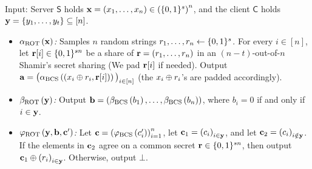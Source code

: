 \documentclass{llncs}
\newcommand{\bOT}[2]{\binom{#2}{#1}\text{-bit-OT}}
\newcommand{\sOT}[3]{\binom{#2}{#1}\text{-}#3\text{-string-OT}}
\newcommand{\rampOT}{\operatorname{ROT}}
\newcommand{\stb}{\operatorname{BCS}}
\newcommand{\INT}{\Pi_{\operatorname{int}}}
\renewcommand{\b}{\myvec{b}}
\renewcommand{\a}{\myvec{a}}
\renewcommand{\c}{\myvec{c}}
\newcommand{\x}{\myvec{x}}
\newcommand{\y}{\myvec{y}}
\newcommand{\srvr}{\alpha}
\newcommand{\clnt}{\beta}
\newcommand{\local}{\varphi}
\renewcommand{\Sc}{\mathsf{S}}
\newcommand{\Cc}{\mathsf{C}}
\begin{document}
\begin{construction}[$\Pi_{\rampOT}$]~

Input: Server $\Sc$ holds $\x=\vect{x_1,\ldots,x_n}\in\left(\zo^{s}\right)^n$, and the client $\Cc$ holds $\y=\set{y_1,\ldots,y_{t}}\su[n]$.

\begin{itemize}
	\item $\srvr_{\rampOT}\of{\x}$\emph{:} Samples $n$ random strings $r_1,\ldots,r_n\leftarrow\{0,1\}^s$. For every $i\in[n]$, let ${\bf r}[i]\in\{0,1\}^{sn}$ be a share of ${\bf r}=(r_1,\ldots,r_n)$ in an $(n-t)$-out-of-$n$ Shamir's secret sharing (We pad ${\bf r}[i]$ if needed). Output $\a = \big(\srvr_{\stb}\of{(x_i\oplus r_i,\myvec{r}[i])}\big)_{i\in[n]}$ (the $x_i\oplus r_i$'s are padded accordingly).
            
	\item $\clnt_{\rampOT}\of{\y}$\emph{:} Output 
    $\b=(\clnt_{\stb}\of{b_1},\ldots,\clnt_{\stb}\of{b_n})$, where $b_i=0$ if and only if $i\in\y$.
            
	\item $\local_{\rampOT}\of{\y,\b,\c'}$\emph{:} Let $\c=\vect{\local_{\stb}\of{c'_i}}_{i=1}^{n}$, let $\c_1=\vect{c_i}_{i\in\y}$, and let $\c_2=\vect{c_i}_{i\notin\y}$. If the elements in $\c_2$ agree on a common secret ${\bf r}\in\{0,1\}^{sn}$, then output $\c_1\xor\vect{r_i}_{i\in\y}$. Otherwise, output $\bot$.
            
	\end{itemize}
\end{construction}
\end{document}

